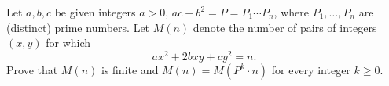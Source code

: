 Let $a, b, c$ be given integers $a > 0$, $ac - b^2 = P = P_1 \cdots P_n$, where $P_1, \ldots, P_n$ are (distinct) prime numbers. Let $M(n)$ denote the number of pairs of integers $(x, y)$ for which
\[ ax^2 + 2bxy + cy^2 = n. \]
Prove that $M(n)$ is finite and $M(n) = M(P^k \cdot n)$ for every integer $k \geq 0$.
